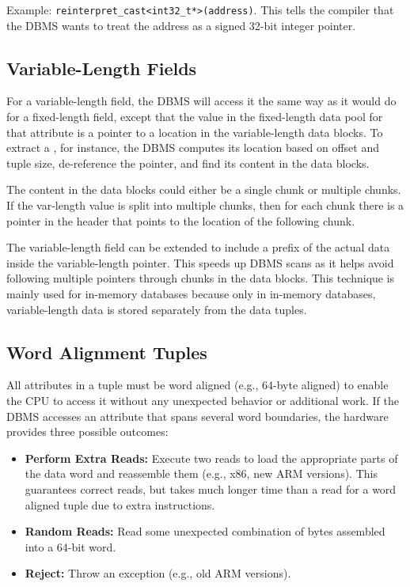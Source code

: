\documentclass[11pt]{article}
\begin{document}
Example: \texttt{reinterpret\_cast<int32\_t*>(address)}. This tells the compiler that the DBMS wants to treat the address as a signed 32-bit integer pointer.

\subsection*{Variable-Length Fields}
For a variable-length field, the DBMS will access it the same way as it would do for a fixed-length field, except that the value in the fixed-length data pool for that attribute is a pointer to a location in the variable-length data blocks. To extract a , for instance, the DBMS computes its location based on offset and tuple size, de-reference the pointer, and find its content in the data blocks. 

The content in the data blocks could either be a single chunk or multiple chunks. If the var-length value is split into multiple chunks, then for each chunk there is a pointer in the header that points to the location of the following chunk.

The variable-length field can be extended to include a prefix of the actual data inside the variable-length pointer. This speeds up DBMS scans as it helps avoid following multiple pointers through chunks in the data blocks. This technique is mainly used for in-memory databases because only in in-memory databases, variable-length data is stored separately from the data tuples.

\subsection*{Word Alignment Tuples}
All attributes in a tuple must be word aligned (e.g., 64-byte aligned) to enable the CPU to access it without any unexpected behavior or additional work. If the DBMS accesses an attribute that spans several word boundaries, the hardware provides three possible outcomes:
\begin{itemize}
    \item \textbf{Perform Extra Reads:} Execute two reads to load the appropriate parts of the data word and reassemble them (e.g., x86, new ARM versions). This guarantees correct reads, but takes much longer time than a read for a word aligned tuple due to extra instructions.
    \item \textbf{Random Reads:} Read some unexpected combination of bytes assembled into a 64-bit word.
    \item \textbf{Reject:} Throw an exception (e.g., old ARM versions).
\end{itemize}
\end{document}
